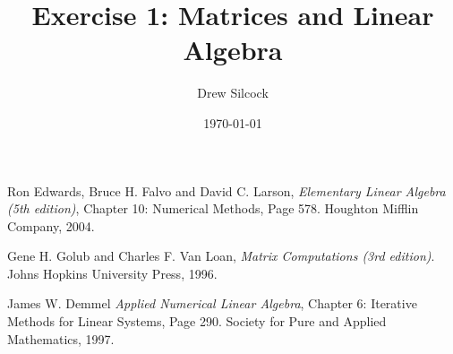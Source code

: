 \documentclass[aps,twocolumn,nobalancelastpage]{revtex4}
\begin{document}
\title{Exercise 1: Matrices and Linear Algebra}
\author{Drew Silcock}
\date{\today}

\maketitle







\begin{thebibliography}{99}

        Ron Edwards, Bruce H. Falvo and David C. Larson,
        \emph{Elementary Linear Algebra (5th edition)},
        Chapter 10: Numerical Methods,
        Page 578.
        Houghton Mifflin Company,
        2004.

        Gene H. Golub and Charles F. Van Loan,
        \emph{Matrix Computations (3rd edition)}.
        Johns Hopkins University Press,
        1996.

        James W. Demmel
        \emph{Applied Numerical Linear Algebra},
        Chapter 6: Iterative Methods for Linear Systems,
        Page 290.
        Society for Pure and Applied Mathematics,
        1997.

\end{thebibliography}
\end{document}
